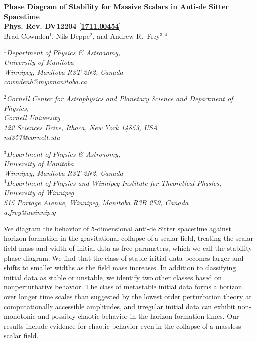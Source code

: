 \documentclass[../PhD.tex]{subfiles}
\begin{document}
\begin{center}
{\bf{\Large Phase Diagram of Stability for Massive Scalars in Anti-de Sitter
Spacetime}} \\
\bigskip
{\bf Phys. Rev. DV12204 $\big[$\href{https://arxiv.org/abs/1711.00454}{1711.00454}$\big]$ } \\
\bigskip
\bigskip
Brad Cownden$^1$, Nils Deppe$^2$, and Andrew R.~Frey$^{3,4}$\\
\bigskip

$^1${\it Department of Physics \& Astronomy,\\ University of Manitoba\\
Winnipeg, Manitoba R3T 2N2, Canada \\ {\rm cowndenb@myumanitoba.ca}} \\
\vspace{0.1in}

$^2${\it Cornell Center for Astrophysics and Planetary Science and
Department of Physics,\\ Cornell University\\
122 Sciences Drive, Ithaca, New York 14853, USA \\ {\rm nd357@cornell.edu}} \\
\vspace{0.1in}

$^3${\it Department of Physics \& Astronomy,\\ University of Manitoba\\
Winnipeg, Manitoba R3T 2N2, Canada} \\
$^4${\it Department of Physics and Winnipeg Institute for Theoretical
Physics,\\ University of Winnipeg\\
515 Portage Avenue, Winnipeg, Manitoba R3B 2E9, Canada \\ {\rm a.frey@uwinnipeg}}
\end{center}

\bigskip

We diagram the behavior of 5-dimensional anti-de Sitter spacetime against 
horizon
formation in the gravitational collapse of a scalar field, treating the scalar
field mass and width of initial data as free parameters, which we call 
the stability phase diagram. We find that the class of stable initial data
becomes larger and shifts to smaller widths as the field
mass increases. In addition to
classifying initial data as stable or unstable, we identify two other classes
based on nonperturbative behavior.  The class of metastable initial data
forms a horizon over
longer time scales than suggested by the lowest order perturbation theory
at computationally accessible amplitudes,
and irregular initial data can exhibit non-monotonic and 
possibly chaotic behavior in
the horizon formation times. Our results include evidence for chaotic
behavior even in the collapse of a massless scalar field.
\end{document}
